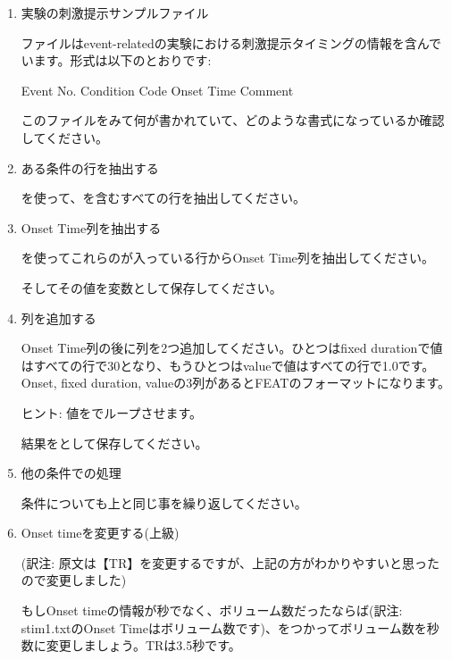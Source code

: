 \documentclass{jsarticle}
\begin{document}
\begin{enumerate}

\item 実験の刺激提示サンプルファイル

{\color{red}}ファイルはevent-relatedの実験における刺激提示タイミングの情報を含んでいます。形式は以下のとおりです:

Event No. \hspace{24pt} Condition Code \hspace{24pt} Onset Time \hspace{24pt} Comment

このファイルをみて何が書かれていて、どのような書式になっているか確認してください。

\item ある条件の行を抽出する

{\color{red}}を使って、{\color{red}}を含むすべての行を抽出してください。

\item Onset Time列を抽出する

{\color{red}}を使ってこれらの{\color{red}}が入っている行からOnset Time列を抽出してください。

そしてその値を変数として保存してください。

\item 列を追加する

Onset Time列の後に列を2つ追加してください。ひとつはfixed durationで値はすべての行で30となり、もうひとつはvalueで値はすべての行で1.0です。Onset, fixed duration, valueの3列があるとFEATのフォーマットになります。

ヒント: 値を{\color{red}}でループさせます。

結果を{\color{red}}として保存してください。

\item 他の条件での処理

条件{\color{red}}についても上と同じ事を繰り返してください。

\item Onset timeを変更する(上級)

(訳注: 原文は【TR】を変更するですが、上記の方がわかりやすいと思ったので変更しました)

もしOnset timeの情報が秒でなく、ボリューム数だったならば(訳注: stim1.txtのOnset Timeはボリューム数です)、{\color{red}}をつかってボリューム数を秒数に変更しましょう。TRは3.5秒です。

\end{enumerate}
\end{document}
